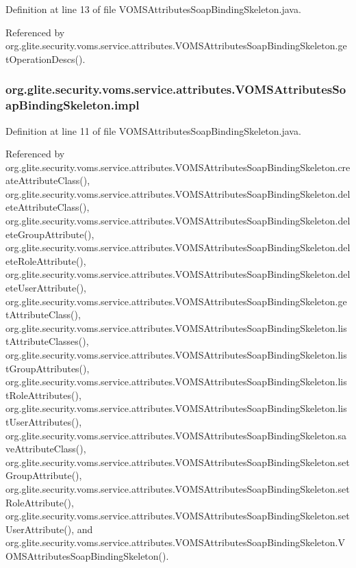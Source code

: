 Definition at line 13 of file VOMSAttributesSoapBindingSkeleton.java.



Referenced by org.glite.security.voms.service.attributes.VOMSAttributesSoapBindingSkeleton.getOperationDescs().

\hypertarget{classorg_1_1glite_1_1security_1_1voms_1_1service_1_1attributes_1_1VOMSAttributesSoapBindingSkeleton_a21e3c265df9eb028b0565ed1ed449a85}{
\subsubsection[{impl}]{ {\bf org.glite.security.voms.service.attributes.VOMSAttributesSoapBindingSkeleton.impl}}}
\label{classorg_1_1glite_1_1security_1_1voms_1_1service_1_1attributes_1_1VOMSAttributesSoapBindingSkeleton_a21e3c265df9eb028b0565ed1ed449a85}


Definition at line 11 of file VOMSAttributesSoapBindingSkeleton.java.



Referenced by org.glite.security.voms.service.attributes.VOMSAttributesSoapBindingSkeleton.createAttributeClass(), org.glite.security.voms.service.attributes.VOMSAttributesSoapBindingSkeleton.deleteAttributeClass(), org.glite.security.voms.service.attributes.VOMSAttributesSoapBindingSkeleton.deleteGroupAttribute(), org.glite.security.voms.service.attributes.VOMSAttributesSoapBindingSkeleton.deleteRoleAttribute(), org.glite.security.voms.service.attributes.VOMSAttributesSoapBindingSkeleton.deleteUserAttribute(), org.glite.security.voms.service.attributes.VOMSAttributesSoapBindingSkeleton.getAttributeClass(), org.glite.security.voms.service.attributes.VOMSAttributesSoapBindingSkeleton.listAttributeClasses(), org.glite.security.voms.service.attributes.VOMSAttributesSoapBindingSkeleton.listGroupAttributes(), org.glite.security.voms.service.attributes.VOMSAttributesSoapBindingSkeleton.listRoleAttributes(), org.glite.security.voms.service.attributes.VOMSAttributesSoapBindingSkeleton.listUserAttributes(), org.glite.security.voms.service.attributes.VOMSAttributesSoapBindingSkeleton.saveAttributeClass(), org.glite.security.voms.service.attributes.VOMSAttributesSoapBindingSkeleton.setGroupAttribute(), org.glite.security.voms.service.attributes.VOMSAttributesSoapBindingSkeleton.setRoleAttribute(), org.glite.security.voms.service.attributes.VOMSAttributesSoapBindingSkeleton.setUserAttribute(), and org.glite.security.voms.service.attributes.VOMSAttributesSoapBindingSkeleton.VOMSAttributesSoapBindingSkeleton().



